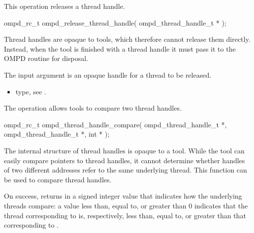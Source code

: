 \label{ompd:ompd_release_thread_handle}
\summary
This operation releases a thread handle.

\format

\cspecificstart
\begin{ompSyntax}
ompd_rc_t ompd_release_thread_handle(
  ompd_thread_handle_t *
);
\end{ompSyntax}
\cspecificend


\descr
Thread handles are opaque to tools, which therefore cannot release them directly.
Instead, when the tool is finished with a thread handle it must pass it to the OMPD 
 routine for disposal.

\argdesc
The input argument  is an opaque handle for a thread
to be released.

\crossreferences
\begin{itemize}
	\item {} type, see .
\end{itemize}


\label{ompd:ompd_thread_handle_compare}
\summary
The  operation allows tools to compare 
two thread handles.

\format

\cspecificstart
\begin{ompSyntax}
ompd_rc_t ompd_thread_handle_compare(
  ompd_thread_handle_t *,
  ompd_thread_handle_t *,
  int *
);
\end{ompSyntax}
\cspecificend


\descr
The internal structure of thread handles is opaque to a tool. While the tool can easily compare 
pointers to thread handles, it cannot determine whether handles of two different addresses
refer to the same underlying thread. This function can be used to compare thread handles.

On success,  returns in  a signed 
integer value that indicates how the underlying threads compare: a value less than, equal to, or 
greater than 0 indicates that the thread corresponding to  is, respectively, 
less than, equal to, or greater than that corresponding to .


